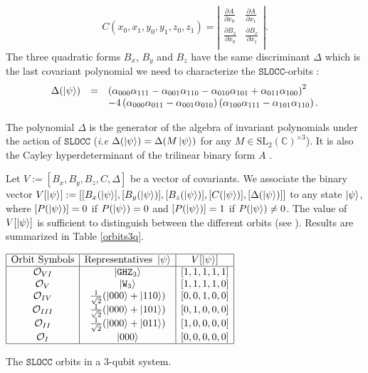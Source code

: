 \documentclass[a4paper,12pt,fleqn]{article}
\newcommand\SLOCC{\mathtt{SLOCC}}
\newcommand\W{\mathtt{W}}
\newcommand\GHZ{\mathtt{GHZ}}
\newcommand\C{\mathbb{C}}
\begin{document}
\begin{equation}
	C(x_0,x_1,y_0,y_1,z_0,z_1)=\left|\begin{array}{cc}
  \frac{\partial A}{\partial x_0}&\frac{\partial A}{\partial x_1}\\
  \frac{\partial B_x}{\partial x_0}&\frac{\partial B_x}{\partial x_1}\\
\end{array}\right|.
\label{cata}\end{equation}
The three quadratic forms $B_x$, $B_y$ and $B_z$ have the same discriminant $\Delta$ which is the last covariant polynomial we need
to characterize the $\SLOCC$-orbits :
\begin{equation}\begin{array}{rcl}
	\Delta(\ket{\psi})&=& \left(\alpha_{000} \alpha_{111} - \alpha_{001} \alpha_{110} - \alpha_{010} \alpha_{101} + \alpha_{011} \alpha_{100}\right)^{2}\\&&-4\left( \alpha_{000} \alpha_{011} -  \alpha_{001} \alpha_{010}\right) \left(\alpha_{100} \alpha_{111} - \alpha_{101} \alpha_{110}\right).\end{array}
    \label{delta3}\end{equation}

  The polynomial $\Delta$ is the generator of the algebra of invariant polynomials under the action of $\SLOCC$ (\textit{i.e} $\Delta(\ket{\psi})=\Delta(M\ket{\psi})$
  for any $M\in\mathrm{SL}_2(\C)^{\times 3}$). It is also the Cayley hyperdeterminant of the trilinear binary form $A$ \cite{1846Cayley}.
  
     Let $V:=[B_x, B_y,B_z,C,\Delta]$ be a vector of covariants. We associate the binary vector
      $V[\ket{\psi}] := [[B_x(\ket{\psi}], [B_y(\ket{\psi})], [B_z(\ket{\psi})], [C(\ket{\psi})], [\Delta(\ket{\psi})]]$ to any state $\ket{\psi}$,
    where $[P(\ket{\psi})] = 0$ if $P(\ket{\psi})= 0$ and $[P(\ket{\psi})] = 1$ if $P(\ket{\psi}) \neq 0$. The value of $V[\ket{\psi}]$ is sufficient to distinguish between the different
orbits (see \cite{2012HLT}). Results are summarized in Table \ref{orbits3q}.

\begin{table}[h]
  \begin{center}
    $\begin{array}{|c|c|c|}\hline
      \text{Orbit Symbols}&\text{Representatives } \ket{\psi}&V[\ket{\psi}]\\\hline
      \mathcal{O}_{VI}&\ket{\GHZ_3}&[1,1,1,1,1]\\
      \mathcal{O}_{V}&\ket{\W_3}&[1,1,1,1,0]\\
      \mathcal{O}_{IV}&\frac{1}{\sqrt2}(\ket{000}+\ket{110})&[0,0,1,0,0]\\
      \mathcal{O}_{III}&\frac{1}{\sqrt2}(\ket{000}+\ket{101})&[0,1,0,0,0]\\
      \mathcal{O}_{II}&\frac{1}{\sqrt2}(\ket{000}+\ket{011})&[1,0,0,0,0]\\
      \mathcal{O}_{I}&\ket{000}&[0,0,0,0,0]\\\hline
      \end{array}$
    \end{center}
    { \caption{The $\SLOCC$ orbits in a 3-qubit system.\label{orbits3q}}}
  \end{table}
\end{document}
